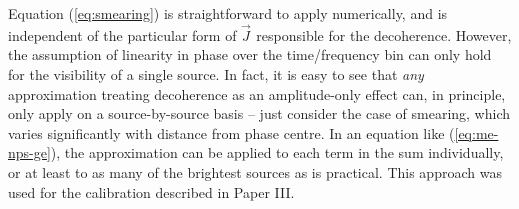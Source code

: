 \documentclass[referee]{aa}
\newcommand{\jones}[2]{\vec {#1}_{#2}}
\begin{document}
%  
%  
%  
%  
%  
%  
%  

Equation (\ref{eq:smearing}) is straightforward to apply numerically, and is independent of the particular form of $\jones{J}{}$ responsible for the decoherence. However, the assumption of linearity in phase over the time/frequency bin can only hold for the visibility of a single source. In fact, it is easy to see that {\em any} approximation treating decoherence as an amplitude-only effect can, in principle, only apply on a source-by-source basis -- just consider the case of smearing, which varies significantly with distance from phase centre. In an equation like (\ref{eq:me-nps-ge}), the approximation can be applied to each term in the sum individually, or at least to as many of the brightest sources as is practical. This approach was used for the calibration described in Paper III.
\end{document}
